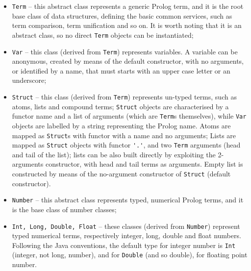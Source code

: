 %
\begin{itemize}
    \item \texttt{Term} -- this abstract class represents a generic Prolog term, and it is the
    root base class of \tuprolog{} data structures, defining the basic common services, such
    as term comparison, term unification and so on.
    It is worth noting that it is an abstract class, so no direct \texttt{Term}
    objects can be instantiated;
    \item \texttt{Var} -- this class (derived from \texttt{Term})
    represents \tuprolog{} variables.
    A variable can be anonymous, created by means of the default constructor, with no
    arguments, or identified by a name, that must starts with an upper case letter or an
    underscore;
    \item \texttt{Struct} -- this class (derived from \texttt{Term})
    represents un-typed \tuprolog{} terms, such as atoms, lists and compound terms;
    \texttt{Struct} objects are characterised by a functor name and a
    list of arguments (which are \texttt{Term}s themselves), while
    \texttt{Var} objects are labelled by a string representing the
    Prolog name.
    Atoms are mapped as \texttt{Struct}s with functor with a name and
    no arguments;
    Lists are mapped as \texttt{Struct} objects with functor
    \verb|'.'|, and two \texttt{Term} arguments (head and tail of the list);
    lists can be also built directly by exploiting the 2-arguments constructor, with
    head and tail terms as arguments.
    Empty list is constructed by means of the no-argument constructor of \texttt{Struct}
    (default constructor).
    \item \texttt{Number} -- this abstract class represents typed, numerical Prolog terms,
        and it is the  base class of \tuprolog{} number classes;
    \item \texttt{Int, Long, Double, Float} -- these classes (derived from \texttt{Number})
    represent  typed numerical \tuprolog{} terms, respectively integer, long, double and
    float numbers.
    Following the Java conventions, the default type for integer number is \texttt{Int}
    (integer, not long, number), and for \texttt{Double} (and so double), for floating point
    number.
\end{itemize}


